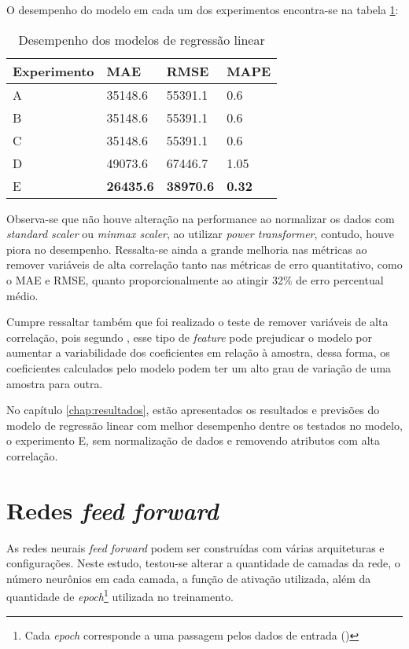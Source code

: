 O desempenho do modelo em cada um dos experimentos 
encontra-se na 
tabela \ref{tab:res_reg_lin}:

\begin{table}[H]
    \centering
    \begin{tabular}{llll}
        \toprule
        Experimento & MAE     & RMSE    & MAPE \\
        \midrule
        A           & 35148.6 & 55391.1 & 0.6  \\
        B           & 35148.6 & 55391.1 & 0.6  \\
        C           & 35148.6 & 55391.1 & 0.6  \\
        D           & 49073.6 & 67446.7 & 1.05 \\
        E           & \textbf{26435.6} & \textbf{38970.6} & \textbf{0.32} \\
        \bottomrule
    \end{tabular}
    \caption{Desempenho dos modelos de regressão linear}
    \label{tab:res_reg_lin}
\end{table}

Observa-se que não houve alteração na performance ao normalizar 
os dados com \textit{standard scaler} ou \textit{minmax scaler},
ao utilizar \textit{power transformer}, contudo, houve piora 
no desempenho. Ressalta-se ainda a grande melhoria nas métricas ao 
remover variáveis de alta correlação tanto nas métricas de erro 
quantitativo, como o MAE e RMSE, quanto proporcionalmente ao 
atingir 32\% de erro percentual médio.

Cumpre ressaltar também que foi realizado o teste de remover variáveis de alta correlação, 
pois segundo \cite{corr_reg_lin}, esse tipo de \textit{feature}
pode prejudicar o modelo por aumentar a variabilidade
dos coeficientes em relação à amostra, dessa forma, os coeficientes 
calculados pelo modelo podem ter um alto grau de variação de uma 
amostra para outra.

No capítulo \ref{chap:resultados}, estão apresentados os 
resultados e previsões do modelo de regressão linear com
melhor desempenho dentre os testados no modelo, o
experimento E, sem   
normalização de dados e removendo atributos com alta 
correlação.

\section{Redes \textit{feed forward}}

As redes neurais \textit{feed forward} podem ser construídas
com várias arquiteturas e configurações. Neste estudo, testou-se
alterar a quantidade de camadas da rede, o número neurônios em 
cada camada, a função de ativação utilizada, além da quantidade
de \textit{epoch}\footnote{Cada \textit{epoch} corresponde a uma passagem pelos dados de entrada (\cite{dl-oreilly})} utilizada no treinamento.

